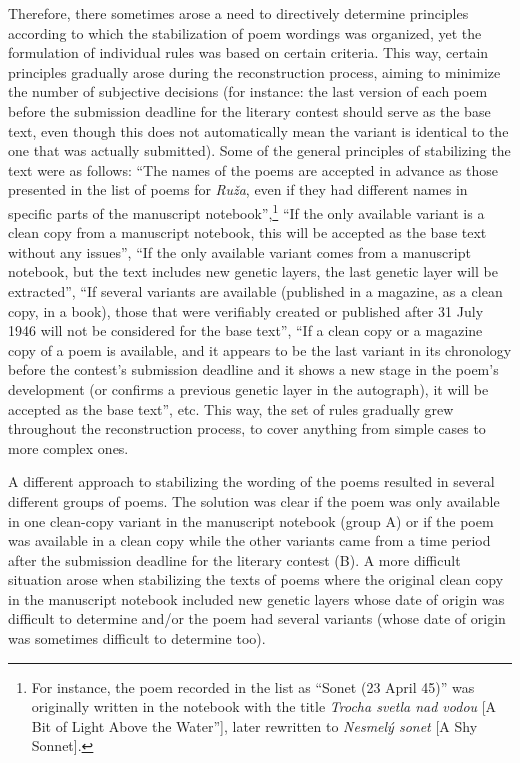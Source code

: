 \documentclass{article}
\begin{document}
Therefore, there sometimes arose a need to directively determine
principles according to which the stabilization of poem wordings was
organized, yet the formulation of individual rules was based on certain
criteria. This way, certain principles gradually arose during the
reconstruction process, aiming to minimize the number of subjective
decisions (for instance: the last version of each poem before the
submission deadline for the literary contest should serve as the base
text, even though this does not automatically mean the variant is
identical to the one that was actually submitted). Some of the general
principles of stabilizing the text were as follows: ``The names of the
poems are accepted in advance as those presented in the list of poems
for \emph{Ruža}, even if they had different names in specific parts of
the manuscript notebook'',\footnote{For instance, the poem recorded in
  the list as ``Sonet (23 April 45)'' was originally written in the
  notebook with the title \emph{Trocha svetla nad vodou} [A Bit of Light
  Above the Water''], later rewritten to \emph{Nesmelý sonet} [A Shy
  Sonnet].} ``If the only available variant is a clean copy from
a manuscript notebook, this will be accepted as the base text without
any issues'', ``If the only available variant comes from a manuscript
notebook, but the text includes new genetic layers, the last genetic
layer will be extracted'', ``If several variants are available
(published in a magazine, as a clean copy, in a book), those that were
verifiably created or published after 31 July 1946 will not be
considered for the base text'', ``If a clean copy or a magazine copy of
a poem is available, and it appears to be the last variant in its chronology
before the contest's submission deadline and it shows a new stage in the
poem's development (or confirms a previous genetic layer in the
autograph), it will be accepted as the base text'', etc. This way, the set of rules
gradually grew throughout the reconstruction process, to cover anything from simple
cases to more complex ones.

A different approach to stabilizing the wording of the poems resulted in
several different groups of poems. The solution was clear if the poem
was only available in one clean-copy variant in the manuscript notebook
(group A) or if the poem was available in a clean copy while the other
variants came from a time period after the submission deadline for the
literary contest (B). A more difficult situation arose when stabilizing
the texts of poems where the original clean copy in the manuscript
notebook included new genetic layers whose date of origin was difficult
to determine and/or the poem had several variants (whose date of origin
was sometimes difficult to determine too).
\end{document}
